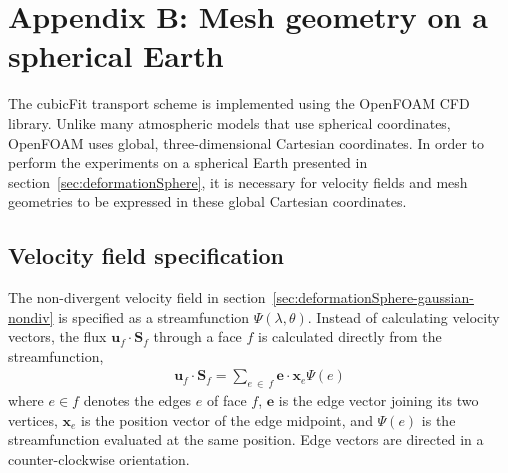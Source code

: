 \section*{Appendix B: Mesh geometry on a spherical Earth}

The cubicFit transport scheme is implemented using the OpenFOAM CFD library.  Unlike many atmospheric models that use spherical coordinates, OpenFOAM uses global, three-dimensional Cartesian coordinates.  In order to perform the experiments on a spherical Earth presented in section~\ref{sec:deformationSphere}, it is necessary for velocity fields and mesh geometries to be expressed in these global Cartesian coordinates.


\subsection*{Velocity field specification}
The non-divergent velocity field in section~\ref{sec:deformationSphere-gaussian-nondiv} is specified as a streamfunction $\Psi(\lambda, \theta)$.  Instead of calculating velocity vectors, the flux $\mathbf{u}_f \cdot \mathbf{S}_f$ through a face $f$ is calculated directly from the streamfunction,
\begin{align}
	\mathbf{u}_f \cdot \mathbf{S}_f	= \sum_{e\:\in\:f} \mathbf{e} \cdot \mathbf{x}_e \Psi(e) \label{eqn:nondiv-spherical-flux}
\end{align}
where $e \in f$ denotes the edges $e$ of face $f$, $\mathbf{e}$ is the edge vector joining its two vertices, $\mathbf{x}_e$ is the position vector of the edge midpoint, and $\Psi(e)$ is the streamfunction evaluated at the same position.
Edge vectors are directed in a counter-clockwise orientation.


